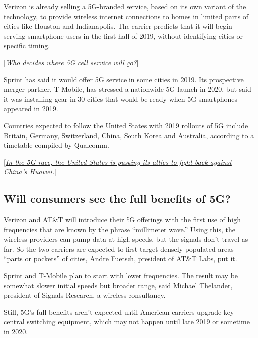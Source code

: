 Verizon is already selling a 5G-branded service, based on its own
variant of the technology, to provide wireless internet connections to
homes in limited parts of cities like Houston and Indianapolis. The
carrier predicts that it will begin serving smartphone users in the
first half of 2019, without identifying cities or specific timing.

{[}\href{https://www.nytimes.com/2018/03/02/technology/5g-cellular-service.html}{\emph{Who
decides where 5G cell service will go?}}{]}

Sprint has said it would offer 5G service in some cities in 2019. Its
prospective merger partner, T-Mobile, has stressed a nationwide 5G
launch in 2020, but said it was installing gear in 30 cities that would
be ready when 5G smartphones appeared in 2019.

Countries expected to follow the United States with 2019 rollouts of 5G
include Britain, Germany, Switzerland, China, South Korea and Australia,
according to a timetable compiled by Qualcomm.

{[}\href{https://www.nytimes.com/2019/01/26/us/politics/huawei-china-us-5g-technology.html}{\emph{In
the 5G race, the United States is pushing its allies to fight back
against China's Huawei}}\emph{.}{]}

\hypertarget{will-consumers-see-the-full-benefits-of-5g}{%
\subsection{Will consumers see the full benefits of
5G?}\label{will-consumers-see-the-full-benefits-of-5g}}

Verizon and AT\&T will introduce their 5G offerings with the first use
of high frequencies that are known by the phrase
``\href{https://www.engadget.com/2018/07/23/how-5g-makes-use-of-millimeter-waves/}{millimeter
wave.}'' Using this, the wireless providers can pump data at high
speeds, but the signals don't travel as far. So the two carriers are
expected to first target densely populated areas --- ``parts or
pockets'' of cities, Andre Fuetsch, president of AT\&T Labs, put it.

Sprint and T-Mobile plan to start with lower frequencies. The result may
be somewhat slower initial speeds but broader range, said Michael
Thelander, president of Signals Research, a wireless consultancy.

Still, 5G's full benefits aren't expected until American carriers
upgrade key central switching equipment, which may not happen until late
2019 or sometime in 2020.

